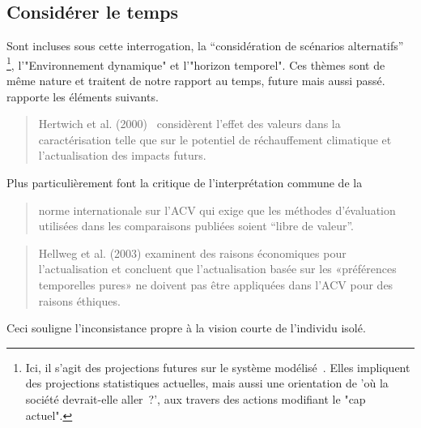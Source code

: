 \subsection{Considérer le temps}
\label{subsec:Considérer le temps}
Sont incluses sous cette interrogation, la ``considération de scénarios alternatifs''
\footnote{
Ici, il s'agit des projections futures sur le système modélisé~\cite{reap_survey_2008}.
Elles impliquent des projections statistiques actuelles, mais aussi une orientation de 'où la société devrait-elle aller~?', aux travers des actions modifiant le "cap actuel".
},
l'"Environnement dynamique" et l'"horizon temporel".
Ces thèmes sont de même nature et traitent de notre rapport au temps, future mais aussi passé.
\citeauthor{murray_transdisciplinary_2015} rapporte les éléments suivants.

\blockcquote[traduction]{murray_transdisciplinary_2015}{
Hertwich et al. (2000)~\cite{hertwich_theoretical_2000} considèrent l'effet des valeurs dans la caractérisation telle que sur le potentiel de réchauffement climatique et l'actualisation des impacts futurs.}
Plus particulièrement \citeauthor{hertwich_theoretical_2000} font la critique de l'interprétation commune de la
\blockcquote[traduction]{hertwich_theoretical_2000}{
norme internationale sur l'ACV qui exige que les méthodes d'évaluation utilisées dans les comparaisons publiées soient ``libre de valeur''.
}

\blockcquote[traduction]{murray_transdisciplinary_2015}{
Hellweg et al. (2003) examinent des raisons économiques pour l'actualisation et concluent que l'actualisation basée sur les «préférences temporelles pures» ne doivent pas être appliquées dans l'ACV pour des raisons éthiques.
}
Ceci souligne l’inconsistance propre à la vision courte de l'individu isolé.

